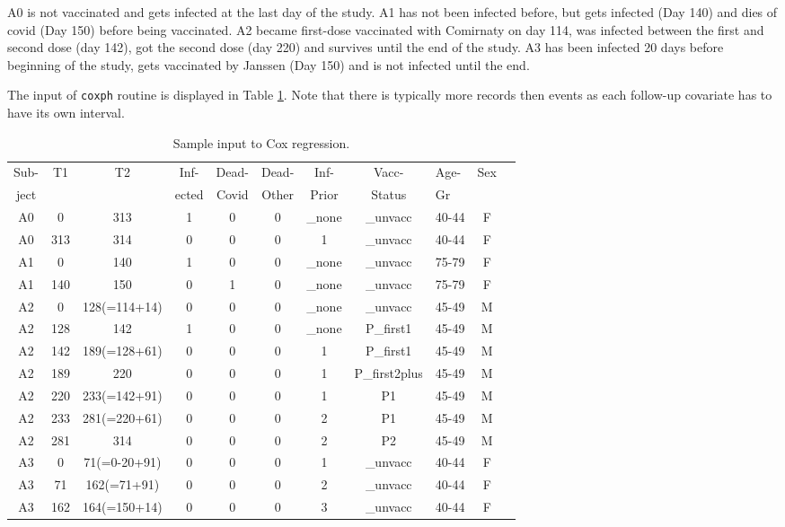 \documentclass[preprint,12pt,authoryear]{elsarticle}
\begin{document}
A0 is not vaccinated and gets infected at the last day of the study.
A1 has not been infected before, but gets infected (Day 140) and dies of covid (Day 150) before being vaccinated. A2 became first-dose vaccinated with Comirnaty on day 114, was infected between the first and second dose (day 142), got the second dose (day 220) and survives until the end of the study. A3 has been infected 20 days before beginning of the study, gets vaccinated by Janssen (Day 150) and is not infected until the end. 

The input of {\tt coxph} routine is displayed in Table \ref{tab:input}. Note that there is typically more records then events as each follow-up covariate has to have its own interval.

\begin{table}
\caption{Sample input to Cox regression. \vspace{3mm}}
\label{tab:input}
\centering
\begin{tabular}{cccccccclcc}
\hline
Sub- & T1 & T2 & Inf- & Dead- & Dead- & Inf-& Vacc-& Age- & Sex \\
ject & & & ected & Covid & Other & Prior & Status & Gr & \\
\hline
A0 & 0 & 313 & 1 & 0& 0 & \_none & \_unvacc & 40-44 & F\\
A0 & 313 & 314 &0 & 0& 0&1 & \_unvacc & 40-44 & F\\
A1 & 0 & 140 & 1 &0 & 0 &\_none & \_unvacc & 75-79 & F\\
A1 & 140 & 150 & 0 & 1 & 0 & \_none &  \_unvacc & 75-79 & F\\
A2 & 0 & 128(=114+14) & 0& 0 & 0   & \_none &  \_unvacc  & 45-49 & M\\
A2 & 128 & 142 & 1 & 0 & 0 & \_none & P\_first1& 45-49 & M\\
A2 & 142 & 189(=128+61) & 0 & 0 & 0 & 1 & P\_first1& 45-49 & M\\
A2 & 189 & 220 & 0 & 0 &0 & 1 & P\_first2plus& 45-49 & M\\
A2 & 220 & 233(=142+91)  & 0 & 0& 0 & 1 & P1 & 45-49 & M\\
A2 & 233 & 281(=220+61) & 0 & 0 & 0 & 2 & P1 & 45-49 & M\\
A2 & 281 & 314 & 0 & 0 & 0 & 2 & P2 & 45-49 & M\\
A3 & 0 & 71(=0-20+91) & 0 &0 &0 & 1 & \_unvacc & 40-44 & F\\
A3 & 71 & 162(=71+91) & 0 &0 &0 & 2 & \_unvacc & 40-44 & F\\
A3 & 162 & 164(=150+14) & 0 &0 &0 & 3 & \_unvacc & 40-44 & F\\

\end{tabular}
\end{table}
\end{document}
